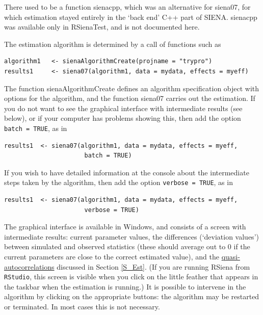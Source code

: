 \documentclass[a4paper,fleqn,11pt]{article}
\newcommand{\+}{\, + \,}
\newcommand{\sfn}[1]{\textsf{#1}}
\newcommand{\RS}{{\sf \textsf{RSiena} }}
\newcommand{\si}{{\sf SIENA}}
\begin{document}
There used to be a function \sfn{sienacpp}, which was
an alternative for \sfn{siena07}, for which
estimation stayed entirely in the `back end' \sfn{C++} part of \si.
\sfn{sienacpp} was available only in \sfn{RSienaTest},
and is not documented here.

The estimation algorithm is determined by a call of functions
such as
\begin{verbatim}
algorithm1   <- sienaAlgorithmCreate(projname = "trypro")
results1     <- siena07(algorithm1, data = mydata, effects = myeff)
\end{verbatim}
The function \textsf{sienaAlgorithmCreate} defines an algorithm specification
object with options for the algorithm, and the function  \textsf{siena07}
carries out the estimation.
If you do not want to see the graphical interface with intermediate
results (see below), or if your computer has problems showing this, then add
the option \texttt{batch = TRUE}, as in
\begin{verbatim}
results1  <- siena07(algorithm1, data = mydata, effects = myeff,
                      batch = TRUE)
\end{verbatim}
If you wish to have detailed information at the console about the intermediate
steps taken by the algorithm, then add
the option \texttt{verbose = TRUE}, as in
\begin{verbatim}
results1  <- siena07(algorithm1, data = mydata, effects = myeff,
                      verbose = TRUE)
\end{verbatim}

The graphical interface is available in Windows, and consists of a
screen with intermediate results: current parameter values, the
differences (`deviation values') between simulated and observed
statistics (these should average out to 0 if the current
parameters are close to the correct estimated value), and the
\hyperlink{T_quasiac}{quasi-autocorrelations} discussed in Section
\ref{S_Est}.
(If you are running \RS from \texttt{RStudio}, this screen is visible
when you click on the little feather that appears in the taskbar
when the estimation is running.)
It is possible to intervene in the algorithm by clicking on the
appropriate buttons:
the algorithm may be restarted or terminated. In most cases
this is not necessary.
\end{document}
